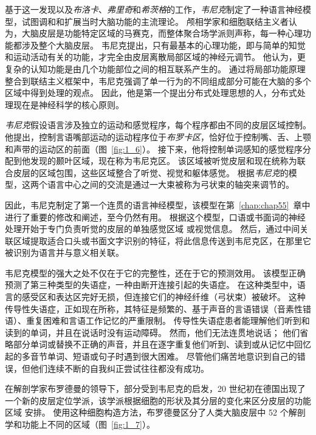 基于这一发现以及\textit{布洛卡}、\textit{弗里奇}和\textit{希茨格}的工作，\textit{韦尼克}制定了一种语言神经模型，试图调和和扩展当时大脑功能的主流理论。
颅相学家和细胞联结主义者认为，大脑皮层是功能特定区域的马赛克，而整体聚合场学派则声称，每一种心理功能都涉及整个大脑皮层。
韦尼克提出，只有最基本的心理功能，即与简单的知觉和运动活动有关的功能，才完全由皮层离散局部区域的神经元调节。
他认为，更复杂的认知功能是由几个功能部位之间的相互联系产生的。
通过将局部功能原理整合到联结主义框架中，韦尼克强调了单一行为的不同组成部分可能在大脑的多个区域中得到处理的观点。
因此，他是第一个提出分布式处理思想的人，分布式处理现在是神经科学的核心原则。


\textit{韦尼克}假设语言涉及独立的运动和感觉程序，每个程序都由不同的皮层区域控制。
他提出，控制言语嘴部运动的运动程序位于\textit{布罗卡区}，恰好位于控制嘴、舌、上颚和声带的运动区的前面（图~\ref{fig:1_6}）。
接下来，他将控制单词感知的感觉程序分配到他发现的颞叶区域，现在称为韦尼克区。
该区域被听觉皮层和现在统称为联合皮层的区域包围，这些区域整合了听觉、视觉和躯体感觉。
根据\textit{韦尼克}的模型，这两个语言中心之间的交流是通过一大束被称为弓状束的轴突来调节的。


因此，韦尼克制定了第一个连贯的语言神经模型，该模型在第~\ref{chap:chap55}~章中进行了重要的修改和阐述，至今仍然有用。
根据这个模型，口语或书面词的神经处理开始于专门负责听觉的皮层的单独感觉区域 或视觉信息。
然后，通过中间关联区域提取适合口头或书面文字识别的特征，将此信息传送到韦尼克区，在那里它被识别为语言并与意义相关联。


韦尼克模型的强大之处不仅在于它的完整性，还在于它的预测效用。
该模型正确预测了第三种类型的失语症，一种由断开连接引起的失语症。
在这种类型中，语言的感受区和表达区完好无损，但连接它们的神经纤维（弓状束）被破坏。
这种传导性失语症，正如现在所称，其特征是频繁的、基于声音的言语错误（音素性错语）、重复困难和言语工作记忆的严重限制。
传导性失语症患者能理解他们听到和读到的单词，并且在说话时没有运动障碍。
然而，他们无法连贯地说话； 他们省略部分单词或替换不正确的声音，并且在逐字重复他们听到、读到或从记忆中回忆起的多音节单词、短语或句子时遇到很大困难。
尽管他们痛苦地意识到自己的错误，但他们连续不断的自我纠正尝试往往都没有成功。


在解剖学家布罗德曼的领导下，部分受到韦尼克的启发，20 世纪初在德国出现了一个新的皮层定位学派，该学派根据细胞的形状及其分层的变化来区分皮层的功能区域 安排。
使用这种细胞构造方法，布罗德曼区分了人类大脑皮层中 52 个解剖学和功能上不同的区域（图~\ref{fig:1_7}）。


